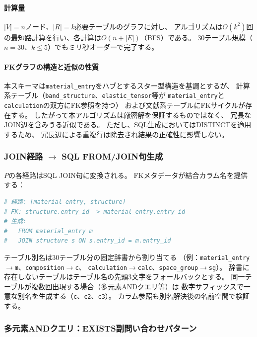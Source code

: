 \documentclass[5p,twocolumn]{elsarticle}
\begin{document}
\paragraph{計算量}
$|V| = n$ノード、$|R| = k$必要テーブルのグラフに対し、
アルゴリズムは$O(k^2)$回の最短路計算を行い、各計算は$O(n + |E|)$（BFS）である。
30テーブル規模（$n = 30$、$k \leq 5$）でもミリ秒オーダーで完了する。

\paragraph{FKグラフの構造と近似の性質}
本スキーマは\texttt{material\_entry}をハブとするスター型構造を基調とするが、
計算系テーブル（\texttt{band\_structure}、\texttt{elastic\_tensor}等が
\texttt{material\_entry}と\texttt{calculation}の双方にFK参照を持つ）
および文献系テーブルにFKサイクルが存在する。
したがって本アルゴリズムは厳密解を保証するものではなく、
冗長なJOIN辺を含みうる近似である。
ただし、SQL生成においてはDISTINCTを適用するため、
冗長辺による重複行は除去され結果の正確性に影響しない。

\subsubsection{JOIN経路 $\to$ SQL FROM/JOIN句生成}

$P$の各経路はSQL JOIN句に変換される。
FKメタデータが結合カラム名を提供する：

\begin{lstlisting}[language=Python,caption={経路からのJOIN句生成。},label=lst:join_gen,numbers=none]
# 経路: [material_entry, structure]
# FK: structure.entry_id -> material_entry.entry_id
# 生成:
#   FROM material_entry m
#   JOIN structure s ON s.entry_id = m.entry_id
\end{lstlisting}

テーブル別名は30テーブル分の固定辞書から割り当てる
（例：\texttt{material\_entry}$\to$\texttt{m}、\texttt{composition}$\to$\texttt{c}、
\texttt{calculation}$\to$\texttt{calc}、\texttt{space\_group}$\to$\texttt{sg}）。
辞書に存在しないテーブルはテーブル名の先頭3文字をフォールバックとする。
同一テーブルが複数回出現する場合（多元素ANDクエリ等）は
数字サフィックスで一意な別名を生成する（\texttt{c}、\texttt{c2}、\texttt{c3}）。
カラム参照も別名解決後の名前空間で検証する。

\subsubsection{多元素ANDクエリ：EXISTS副問い合わせパターン}
\label{sec:multi_element}
\end{document}
